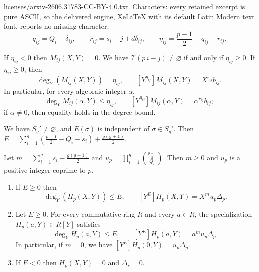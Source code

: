 \documentclass[10pt,a4paper]{amsart}
\newcommand{\cT}{\mathcal{T}}
\begin{document}
licenses/arxiv-2606.31783-CC-BY-4.0.txt. Characters: every retained excerpt is pure ASCII, so the delivered engine, XeLaTeX with its default Latin Modern text font, reports no missing character.
\begin{equation}\label{E:eta}
q_{ij}=Q_i-\delta_{ij},
\qquad
r_{ij}=s_i-j+d\delta_{ij},\qquad
\eta_{ij}=\frac{p-1}{2}-q_{ij}-r_{ij}.
\end{equation}

\begin{lemma}\label{L:entry}
If $\eta_{ij}<0$ then $M_{ij}(X,Y)=0$. 
We have $\cT(p\,i-j)\ne \varnothing$ if and only if $\eta_{ij}\ge 0$. 
If $\eta_{ij}\ge 0$, then 
$$
\deg_Y(M_{ij}(X,Y))=  \eta_{ij},\qquad
[Y^{\eta_{ij}}]M_{ij}(X,Y)=X^{r_{ij}}b_{ij}.
$$
In particular, for every algebraic integer $\alpha$, 
$$\deg_Y M_{ij}(\alpha,Y)\le \eta_{ij},
\qquad
[Y^{\eta_{ij}}]M_{ij}(\alpha,Y)=\alpha^{r_{ij}}b_{ij};
$$
if $\alpha\ne 0$, then equality holds in the degree bound.
\end{lemma}

\begin{lemma}\label{L:E}
We have $S_g'\ne \varnothing$, and $E(\sigma)$ is independent of 
$\sigma\in S_g'$. Then 
$
E=\sum_{i=1}^g \left(\frac{p-1}{2}-Q_i-s_i\right)+\frac{g(g+1)}{2}.
$
\end{lemma}

\begin{proposition}\label{P:D_p} %
Let
$m=\sum_{i=1}^gs_i-\frac{g(g+1)}{2}$ and $u_p=
    \prod_{i=1}^g\binom{\frac{p-1}{2}}{Q_i}$.
Then $m\ge 0$ and $u_p$ is a positive integer coprime to $p$. 
\begin{enumerate}
\item If $E\ge 0$ then 
$$\deg_Y(H_{p}(X,Y))\le E, \qquad
[Y^E]H_{p}(X,Y) =X^m u_p \Delta_p.$$
\item Let $E\ge 0$. For every commutative ring $R$ and every $a \in R$, the specialization $H_p(a,Y)\in R[Y]$ satisfies 
$$
\deg_YH_p(a,Y)\le E, \qquad 
[Y^E]H_p(a,Y)=a^m u_p \Delta_p.
$$
In particular, if $m=0$, we have $[Y^E]H_p(0,Y)=u_p\Delta_p.$
\item 
If $E<0$ then $H_{p}(X,Y)=0$ and $\Delta_p=0$.
\end{enumerate}
\end{proposition}
\end{document}
